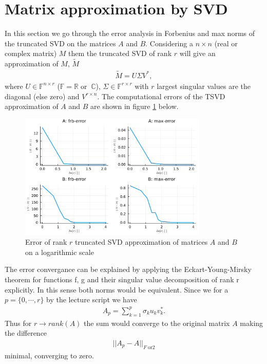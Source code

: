 \documentclass[a4paper]{article}
\begin{document}
\section{Matrix approximation by SVD}
In this section we go through the error analysis in Forbenius and max norms
of the truncated SVD on the matrices $A$ and $B$. Considering a $n \times n$
(real or complex matrix) $M$ them the truncated SVD of rank $r$ will give
an approximation of $M$, $\tilde{M}$
\begin{align}
    \tilde{M} = U \Sigma V^*,
\end{align}
where $U \in \mathbb{F}^{n \times r}$ ($\mathbb{F} = \mathbb{R}
\;\text{or}\;\; \mathbb{C}$), $\Sigma \in \mathbb{F}^{r \times r}$
with $r$ largest singular values are the diagonal (else zero) and $V^{r
\times n}$. The computational errors of the TSVD approximation of  $A$ and
$B$ are shown in figure \ref{fig:svd-err} below.
\begin{figure}[H]
    \centering
    \includegraphics[width=0.8\textwidth]{plots/svd-err.png}
    \caption{\label{fig:svd-err}Error of rank $r$ truncated SVD approximation
    of matrices $A$ and $B$ on a logarithmic scale}
\end{figure}
The error convergance can be explained by applying the Eckart-Young-Mirsky
theorem for functions f, g and their singular value decomposition of rank r explicitly.
In this sense both norms would be equivalent. Since we for a $p =
\{0,\cdots,r\}$ by the lecture script we have
\begin{align}
    A_p = \sum_{k=1}^p \sigma_k u_k v^*_k.
\end{align}
Thus for $r \rightarrow rank(A)$ the sum would converge to the original
matrix $A$ making the difference
\begin{align}
    ||A_p - A||_{F \;\text{or} 2}
\end{align}
minimal, converging to zero.
\end{document}

